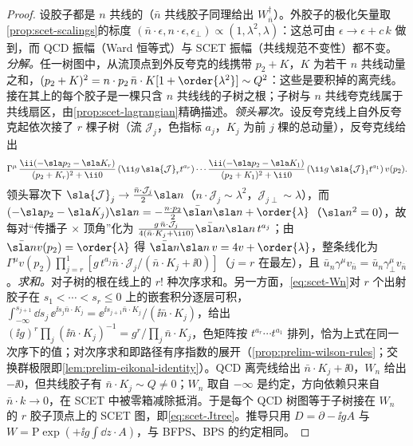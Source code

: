 \begin{proof}
设胶子都是 $n$ 共线的（$\bar n$ 共线胶子同理给出 $W_{\bar n}^\dagger$）。外胶子的极化矢量取\cref{prop:scet-scalings}的标度 $(\bar n\cdot\epsilon,n\cdot\epsilon,\epsilon_\perp)\propto(1,\lambda^2,\lambda)$：这总可由 $\epsilon\to\epsilon+c\,k$ 做到，而 QCD 振幅（Ward 恒等式）与 SCET 振幅（共线规范不变性）都不变。\emph{分解。}任一树图中，从流顶点到外反夸克的线携带 $p_2+K$，$K$ 为若干 $n$ 共线动量之和，$(p_2+K)^2=n\cdot p_2\,\bar n\cdot K[1+\order{\lambda^2}]\sim Q^2$：这些是要积掉的离壳线。接在其上的每个胶子是一棵只含 $n$ 共线线的子树之根；子树与 $n$ 共线夸克线属于共线扇区，由\cref{prop:scet-lagrangian}精确描述。\emph{领头幂次。}设反夸克线上自外反夸克起依次接了 $r$ 棵子树（流 $\mathcal J_j$，色指标 $a_j$，$K_j$ 为前 $j$ 棵的总动量），反夸克线给出
\[
\Gamma^\mu\,\frac{\ii(-\sla p_2-\sla K_r)}{(p_2+K_r)^2+\ii0}\,(\ii g\,\sla{\mathcal J}_r t^{a_r})\cdots\frac{\ii(-\sla p_2-\sla K_1)}{(p_2+K_1)^2+\ii0}\,(\ii g\,\sla{\mathcal J}_1t^{a_1})\,v(p_2).
\]
领头幂次下 $\sla{\mathcal J}_j\to\frac{\bar n\cdot\mathcal J_j}{2}\sla n$（$n\cdot\mathcal J_j\sim\lambda^2$，$\mathcal J_{j\perp}\sim\lambda$），而 $(-\sla p_2-\sla K_j)\sla n=-\frac{n\cdot p_2}{2}\bar{\sla n}\sla n+\order{\lambda}$（$\sla n^2=0$），故每对“传播子 × 顶角”化为 $\frac{g\,\bar n\cdot\mathcal J_j}{4(\bar n\cdot K_j+\ii0)}\bar{\sla n}\sla n\,t^{a_j}$；由 $\bar{\sla n}v(p_2)=\order{\lambda}$ 得 $\bar{\sla n}\sla n\,v=4v+\order{\lambda}$，整条线化为 $\Gamma^\mu v(p_2)\prod_{j=r}^{1}[g\,t^{a_j}\bar n\cdot\mathcal J_j/(\bar n\cdot K_j+\ii0)]$（$j=r$ 在最左），且 $\bar u_n\gamma^\mu v_{\bar n}=\bar u_n\gamma_\perp^\mu v_{\bar n}$。\emph{求和。}对子树的根在线上的 $r!$ 种次序求和。另一方面，\cref{eq:scet-Wn}对 $r$ 个出射胶子在 $s_1<\cdots<s_r\le0$ 上的嵌套积分逐层可积，$\int_{-\infty}^{s_{j+1}}\dd s_j\,\ee^{\ii s_j\bar n\cdot K_j}=\ee^{\ii s_{j+1}\bar n\cdot K_j}/(\ii\bar n\cdot K_j)$，给出 $(\ii g)^r\prod_j(\ii\bar n\cdot K_j)^{-1}=g^r/\prod_j\bar n\cdot K_j$，色矩阵按 $t^{a_r}\cdots t^{a_1}$ 排列，恰为上式在同一次序下的值；对次序求和即路径有序指数的展开（\cref{prop:prelim-wilson-rules}；交换群极限即\cref{lem:prelim-eikonal-identity}）。QCD 离壳线给出 $\bar n\cdot K_j+\ii0$，$W_n$ 给出 $-\ii0$，但共线胶子有 $\bar n\cdot K_j\sim Q\neq0$；$W_n$ 取自 $-\infty$ 是约定，方向依赖只来自 $\bar n\cdot k\to0$，在 SCET 中被零箱减除抵消\cite{RothsteinStewart2016}。于是每个 QCD 树图等于子树接在 $W_n$ 的 $r$ 胶子顶点上的 SCET 图，即\cref{eq:scet-Jtree}。推导只用 $D=\partial-\ii gA$ 与 $W=\mathrm P\exp(+\ii g\int\dd z\cdot A)$，与 BFPS、BPS 的约定相同。
\end{proof}

